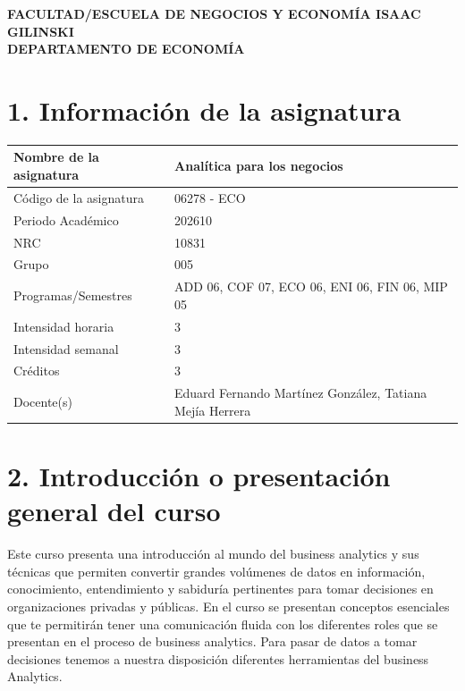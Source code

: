 \documentclass[11pt,a4paper]{article}
\begin{document}
\begin{center}
{\Large \textbf{FACULTAD/ESCUELA DE NEGOCIOS Y ECONOMÍA ISAAC GILINSKI}}\\
\textbf{DEPARTAMENTO DE ECONOMÍA}
\end{center}

\vspace{0.5cm}

\section*{1. Información de la asignatura}

\begin{tabular}{|p{6cm}|p{9cm}|}
\hline
Nombre de la asignatura & Analítica para los negocios \\ \hline
Código de la asignatura & 06278 - ECO \\ \hline
Periodo Académico & 202610 \\ \hline
NRC & 10831 \\ \hline
Grupo & 005 \\ \hline
Programas/Semestres & ADD 06, COF 07, ECO 06, ENI 06, FIN 06, MIP 05 \\ \hline
Intensidad horaria & 3 \\ \hline
Intensidad semanal & 3 \\ \hline
Créditos & 3 \\ \hline
Docente(s) &  Eduard Fernando Martínez González, Tatiana Mejía Herrera \\ \hline
\end{tabular}

\section*{2. Introducción o presentación general del curso}

Este curso presenta una introducción al mundo del business analytics y sus técnicas que permiten convertir grandes volúmenes de datos en información, conocimiento, entendimiento y sabiduría pertinentes para tomar decisiones en organizaciones privadas y públicas. En el curso se presentan conceptos esenciales que te permitirán tener una comunicación fluida con los diferentes roles que se presentan en el proceso de business analytics. Para pasar de datos a tomar decisiones tenemos a nuestra disposición diferentes herramientas del business Analytics.

\vspace{0.3cm}
\end{document}
